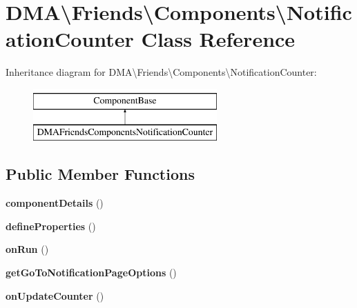 \hypertarget{classDMA_1_1Friends_1_1Components_1_1NotificationCounter}{}\section{D\+M\+A\textbackslash{}Friends\textbackslash{}Components\textbackslash{}Notification\+Counter Class Reference}
\label{classDMA_1_1Friends_1_1Components_1_1NotificationCounter}
Inheritance diagram for D\+M\+A\textbackslash{}Friends\textbackslash{}Components\textbackslash{}Notification\+Counter\+:\begin{figure}[H]
\begin{center}
\leavevmode
\includegraphics[height=2.000000cm]{d7/def/classDMA_1_1Friends_1_1Components_1_1NotificationCounter}
\end{center}
\end{figure}
\subsection*{Public Member Functions}
\begin{DoxyCompactItemize}
\item 
\hypertarget{classDMA_1_1Friends_1_1Components_1_1NotificationCounter_a670cc0b67254ca6330cb90e78d00ec50}{}{\bfseries component\+Details} ()\label{classDMA_1_1Friends_1_1Components_1_1NotificationCounter_a670cc0b67254ca6330cb90e78d00ec50}

\item 
\hypertarget{classDMA_1_1Friends_1_1Components_1_1NotificationCounter_acc9c8dda0d8fcb5d55f8b6bdcd93914e}{}{\bfseries define\+Properties} ()\label{classDMA_1_1Friends_1_1Components_1_1NotificationCounter_acc9c8dda0d8fcb5d55f8b6bdcd93914e}

\item 
\hypertarget{classDMA_1_1Friends_1_1Components_1_1NotificationCounter_a11868691e1796cd39a3821cf8fa752a0}{}{\bfseries on\+Run} ()\label{classDMA_1_1Friends_1_1Components_1_1NotificationCounter_a11868691e1796cd39a3821cf8fa752a0}

\item 
\hypertarget{classDMA_1_1Friends_1_1Components_1_1NotificationCounter_aa2ef7ee56cae987954e55457d8f790c4}{}{\bfseries get\+Go\+To\+Notification\+Page\+Options} ()\label{classDMA_1_1Friends_1_1Components_1_1NotificationCounter_aa2ef7ee56cae987954e55457d8f790c4}

\item 
\hypertarget{classDMA_1_1Friends_1_1Components_1_1NotificationCounter_a4224d3d34ae20ed7dadf26de47bf4873}{}{\bfseries on\+Update\+Counter} ()\label{classDMA_1_1Friends_1_1Components_1_1NotificationCounter_a4224d3d34ae20ed7dadf26de47bf4873}

\end{DoxyCompactItemize}
